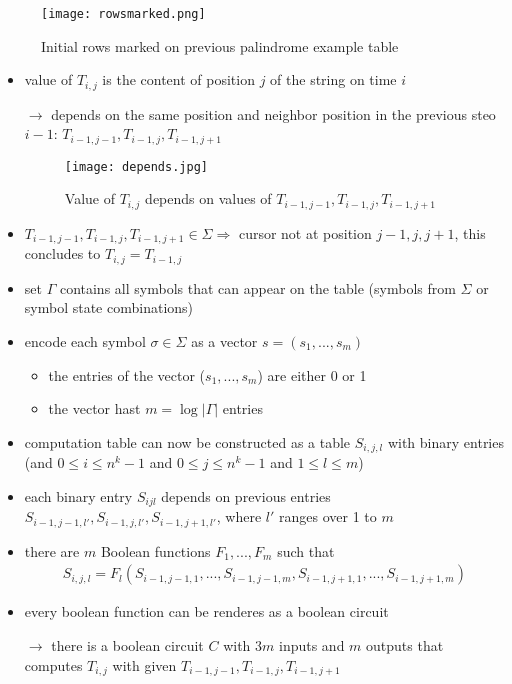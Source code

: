 \documentclass[a4]{scrartcl}
\begin{document}
\begin{figure}[H]
\begin{center}
\texttt{[image: rowsmarked.png]}
\end{center}
\caption{Initial rows marked on previous palindrome example table}
\end{figure}

\begin{itemize}
\item value of $T_{i,j}$ is the content of position $j$ of the string on time $i$
\item[$\rightarrow$] depends on the same position and neighbor position in the previous steo $i-1$: $T_{i-1,j-1}, T_{i-1,j}, T_{i-1,j+1}$
\item[] \begin{figure}[H]
\begin{center}
\texttt{[image: depends.jpg]}
\end{center}
\caption{Value of $T_{i,j}$ depends on values of $T_{i-1,j-1}, T_{i-1,j}, T_{i-1,j+1}$}
\end{figure}
\item $T_{i-1,j-1}, T_{i-1,j}, T_{i-1,j+1} \in \Sigma \Rightarrow$ cursor not at position $j-1, j, j+1$, this concludes to $T_{i,j}=T_{i-1,j}$ \\
\item set $\Gamma$ contains all symbols that can appear on the table (symbols from $\Sigma$ or symbol state combinations)
\item encode each symbol $\sigma \in \Sigma$ as a vector $s=(s_1,...,s_m)$ 
\begin{itemize}
\item the entries of the vector ($s_1,...,s_m$) are either 0 or 1
\item the vector hast $m=\log |\Gamma|$ entries
\end{itemize}
\item computation table can now be constructed as a table $S_{i,j,l}$ with binary entries (and $0 \leq i \leq n^k -1$ and $0 \leq j \leq n^k -1$ and $1 \leq l \leq m$)
\item each binary entry $S_{ijl}$ depends on previous entries $S_{i-1,j-1,l'}, S_{i-1,j,l'}, S_{i-1,j+1,l'}$, where $l'$ ranges over 1 to $m$
\item there are $m$ Boolean functions $F_1,...,F_m$ such that
\begin{align*}
S_{i,j,l}=F_l(S_{i-1,j-1,1},..., S_{i-1,j-1,m}, S_{i-1,j+1,1},...,S_{i-1,j+1,m})
\end{align*}
\item every boolean function can be renderes as a boolean circuit
\item[$\rightarrow$] there is a boolean circuit $C$ with $3m$ inputs and $m$ outputs that computes $T_{i,j}$ with given $T_{i-1,j-1}, T_{i-1,j}, T_{i-1,j+1}$ \\


\end{itemize}
\end{document}
